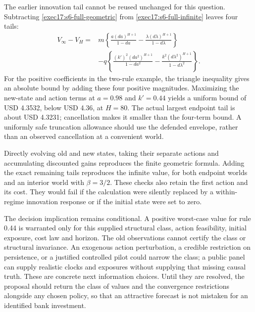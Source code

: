 The earlier innovation tail cannot be reused unchanged for this question.
Subtracting \eqref{exec17:s6-full-geometric} from
\eqref{exec17:s6-full-infinite} leaves four tails:
\begin{equation}
 \begin{split}
 V_\infty-V_H={}&m\left\{
 \frac{a(da)^{H+1}}{1-da}
 -\frac{\lambda(d\lambda)^{H+1}}{1-d\lambda}\right\}\\
 &-q\left\{\frac{(k')^2(da^2)^{H+1}}{1-da^2}
 -\frac{k^2(d\lambda^2)^{H+1}}{1-d\lambda^2}\right\}.
 \end{split}
 \label{exec17:s6-full-tail}
\end{equation}
For the positive coefficients in the two-rule example, the triangle
inequality gives an absolute bound by adding these four positive
magnitudes. Maximizing the new-state and action terms at $a=0.98$ and
$k'=0.44$ yields a uniform bound of USD 4.3532, below USD 4.36, at $H=80$.
The actual largest endpoint tail is about USD 4.3231; cancellation makes
it smaller than the four-term bound. A uniformly safe truncation allowance
should use the defended envelope, rather than an observed cancellation
at a convenient world.\citep{exec17_s6_extension}

Directly evolving old and new states, taking their separate actions and
accumulating discounted gains reproduces the finite geometric formula.
Adding the exact remaining tails reproduces the infinite value, for both
endpoint worlds and an interior world with $\beta=3/2$. These checks also
retain the first action and its cost. They would fail if the calculation
were silently replaced by a within-regime innovation response or if the
initial state were set to zero.

The decision implication remains conditional. A positive worst-case value
for rule 0.44 is warranted only for this supplied structural class, action
feasibility, initial exposure, cost law and horizon. The old observations
cannot certify the class or structural invariance. An exogenous action
perturbation, a credible restriction on persistence, or a justified
controlled pilot could narrow the class; a public panel can supply
realistic clocks and exposures without supplying that missing causal
truth. These are concrete next information choices. Until they are
resolved, the proposal should return the class of values and the
convergence restrictions alongside any chosen policy, so that an
attractive forecast is not mistaken for an identified bank investment.
